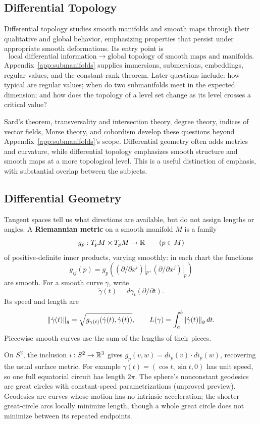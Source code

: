 \subsection*{Differential Topology}

\label{sec:differential-topology-preview}
Differential topology studies smooth manifolds and smooth maps through
their qualitative and global behavior, emphasizing properties that persist
under appropriate smooth deformations. Its entry point is
\[
\text{local differential information}\longrightarrow
\text{global topology of smooth maps and manifolds}.
\]
Appendix~\ref{app:submanifolds} supplies immersions, submersions,
embeddings, regular values, and the constant-rank theorem. Later questions
include: how typical are regular values; when do two submanifolds meet
in the expected dimension; and how does the topology of a level set change
as its level crosses a critical value?

Sard's theorem, transversality and intersection theory, degree theory,
indices of vector fields, Morse theory, and cobordism develop these
questions beyond Appendix~\ref{app:submanifolds}'s scope. Differential geometry often adds
metrics and curvature, while differential topology emphasizes smooth
structure and smooth maps at a more topological level. This is a useful
distinction of emphasis, with substantial overlap between the subjects.

\subsection*{Differential Geometry}

Tangent spaces tell us what directions are available, but do not assign
lengths or angles. A \textbf{Riemannian metric} on a smooth manifold $M$ is
a family
\[
g_p:T_pM\times T_pM\to\mathbb{R}\qquad(p\in M)
\]
of positive-definite inner products, varying smoothly: in each chart the
functions
\[
g_{ij}(p)=g_p((\partial/\partial x^i)|_p,
(\partial/\partial x^j)|_p)
\]
 are smooth. For a smooth curve $\gamma$,
write
\[
\dot\gamma(t)=d\gamma_t(\partial/\partial t).
\]
 Its speed and length are
\[
\lVert \dot\gamma(t)\rVert_g=
\sqrt{g_{\gamma(t)}(\dot\gamma(t),\dot\gamma(t))},\qquad
L(\gamma)=\int_a^b\lVert \dot\gamma(t)\rVert_g\,dt.
\]
Piecewise smooth curves use the sum of the lengths of their pieces.

On $S^2$, the inclusion $i:S^2\to\mathbb{R}^3$ gives
$g_p(v,w)=di_p(v)\cdot di_p(w)$, recovering the usual surface metric.
For example $\gamma(t)=(\cos t,\sin t,0)$ has unit speed, so one full
equatorial circuit has length $2\pi$. The sphere's nonconstant geodesics
are great circles with constant-speed parametrizations (unproved preview).
Geodesics are curves whose motion has no intrinsic acceleration; the
shorter great-circle arcs locally minimize length, though a whole great
circle does not minimize between its repeated endpoints.


